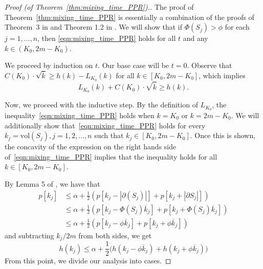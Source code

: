 \documentclass[11pt,twoside]{article}
\newcommand{\vol}{\mathrm{vol}}
\newcommand{\abs}[1]{\left \lvert #1 \right \rvert}
\newcommand{\1}{\mathbf{1}}
\begin{document}
\begin{proof}[Proof (of Theorem~\ref{thm:mixing_time_PPR}).]
	The proof of Theorem~\ref{thm:mixing_time_PPR} is essentially a combination of the proofs of Theorem~3 in \citet{andersen2006} and Theorem 1.2 in \citet{lovasz1990}. We will show that if $\Phi(S_j) > \phi$ for each $j = 1,\ldots,n$, then \eqref{eqn:mixing_time_PPR} holds for all $t$ and any $k \in (K_0,2m - K_0)$.
	
	We proceed by induction on $t$. Our base case will be $t = 0$. Observe that $C(K_0) \cdot \sqrt{\overline{k}} \geq  h(k) - L_{K_0}(k)$ for all $k \in [K_0,2m - K_0]$, which implies
	\begin{equation*}
	L_{K_0}(k) + C(K_0) \cdot \sqrt{\overline{k}} \geq h(k).
	\end{equation*}
	
	Now, we proceed with the inductive step. By the definition of $L_{K_0}$, the inequality~\eqref{eqn:mixing_time_PPR} holds when $k = K_0$ or $k = 2m - K_0$. We will additionally show that~\eqref{eqn:mixing_time_PPR} holds for every $k_j = \vol(S_j), j = 1,2,\ldots,n$ such that $k_j \in [K_0, 2m - K_0]$. Once this is shown, the concavity of the expression on the right hands side of~\eqref{eqn:mixing_time_PPR} implies that the inequality holds for all $k \in [K_0,2m - K_0]$.
	
	By Lemma 5 of \citet{andersen2006}, we have that
	\begin{align}
	p[k_j] & \leq \alpha + \frac{1}{2}  \left(p[k_j - \abs{\partial(S_j)}] + p[k_j + \abs{\partial{S_j}}]  \right) \nonumber\\
	& \leq \alpha + \frac{1}{2} \left(p[k_j - \Phi(S_j) \overline{k}_j] + p[k_j + \Phi(S_j) \overline{k}_j]  \right) \nonumber \\
	& \leq \alpha + \frac{1}{2} \left(p[k_j - \phi \overline{k}_j] + p[k_j + \phi \overline{k}_j]\right) \nonumber
	\end{align}
	and subtracting $k_j/2m$ from both sides, we get
	\begin{equation}
	\label{eqn:mixing_time_PPR_pf1}
	h(k_j) \leq \alpha + \frac{1}{2} \bigl(h(k_j - \phi \overline{k}_j) + h(k_j +  \phi \overline{k}_j) \bigr)
	\end{equation}
	From this point, we divide our analysis into cases. 
	

\end{proof}
\end{document}
